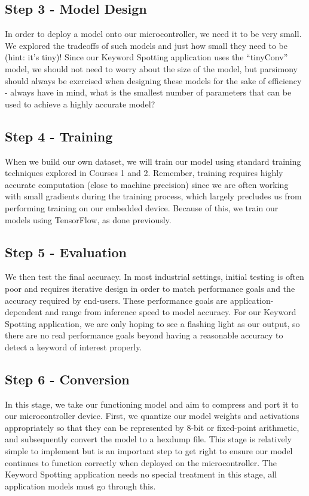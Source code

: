   \subsection{Step 3 - Model Design}
  
 In order to deploy a model onto our microcontroller, we need it to be very small. We explored the tradeoffs of such models and just how small they need to be (hint: it’s tiny)! Since our Keyword Spotting application uses the “tinyConv” model, we should not need to worry about the size of the model, but parsimony should always be exercised when designing these models for the sake of efficiency - always have in mind, what is the smallest number of parameters that can be used to achieve a highly accurate model?
 
  \subsection{Step 4 - Training}
  
 When we build our own dataset, we will train our model using standard training techniques explored in Courses 1 and 2. Remember, training requires highly accurate computation (close to machine precision) since we are often working with small gradients during the training process, which largely precludes us from performing training on our embedded device. Because of this, we train our models using TensorFlow, as done previously.
 
 \subsection{Step 5 - Evaluation}
 We then test the final accuracy. In most industrial settings, initial testing is often poor and requires iterative design in order to match performance goals and the accuracy required by end-users. These performance goals are application-dependent and range from inference speed to model accuracy. For our Keyword Spotting application, we are only hoping to see a flashing light as our output, so there are no real performance goals beyond having a reasonable accuracy to detect a keyword of interest properly.
 
 \subsection{Step 6 - Conversion}
 
 In this stage, we take our functioning model and aim to compress and port it to our microcontroller device. First, we quantize our model weights and activations appropriately so that they can be represented by 8-bit or fixed-point arithmetic, and subsequently convert the model to a hexdump file. This stage is relatively simple to implement but is an important step to get right to ensure our model continues to function correctly when deployed on the microcontroller. The Keyword Spotting application needs no special treatment in this stage, all application models must go through this.
 
